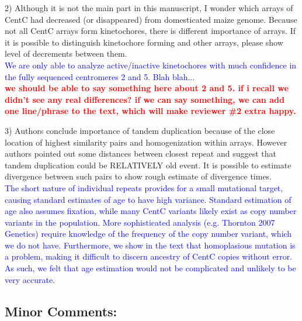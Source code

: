 \documentclass[]{article}
\newcommand{\res}[1]{\noindent \textcolor{blue}{{#1}} \\}
\newcommand{\jri}[1]{\textcolor{red}{{\bf #1}} }
\begin{document}
2) Although it is not the main part in this manuscript, I wonder which arrays of CentC had decreased (or disappeared) from domesticated maize genome. Because not all CentC arrays form kinetochores, there is different importance of arrays. If it is possible to distinguish kinetochore forming and other arrays, please show level of decrements between them.\\

\res{We are only able to analyze active/inactive kinetochores with much confidence in the fully sequenced centromeres 2 and 5.  Blah blah... } \jri{ we should be able to say something here about 2 and 5. if i recall we didn't see any real differences? if we can say something, we can add one line/phrase to the text, which will make reviewer \#2 extra happy.\\ } 

3) Authors conclude importance of tandem duplication because of the close location of highest similarity pairs and homogenization within arrays. However authors pointed out some distances between closest repeat and suggest that tandem duplication could be RELATIVELY old event. It is possible to estimate divergence between such pairs to show rough estimate of divergence times.\\

\res{The short nature of individual repeats provides for a small mutational target, causing standard estimates of age to have high variance.  
Standard estimation of age also assumes fixation, while many CentC variants likely exist as copy number variants in the population. More sophisticated analysis (e.g. Thornton 2007 Genetics) require knowledge of the frequency of the copy number variant, which we do not have.
Furthermore, we show in the text that homoplasious mutation is a problem, making it difficult to discern ancestry of CentC copies without error.  As such, we felt that age estimation would not be complicated and unlikely to be very accurate.}

\subsection*{Minor Comments:}
\end{document}
